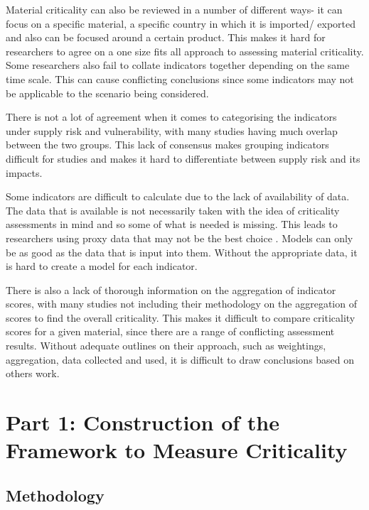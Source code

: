 \documentclass{article}
\begin{document}
Material criticality can also be reviewed in a number of different ways- it can focus on a specific material, a specific country in which it is imported/ exported and also can be focused around a certain product. This makes it hard for researchers to agree on a one size fits all approach to assessing material criticality. Some researchers also fail to collate indicators together depending on the same time scale. This can cause conflicting conclusions since some indicators may not be applicable to the scenario being considered.  

There is not a lot of agreement when it comes to categorising the indicators under supply risk and vulnerability, with many studies having much overlap between the two groups. This lack of consensus makes grouping indicators difficult for studies and makes it hard to differentiate between supply risk and its impacts. 

Some indicators are difficult to calculate due to the lack of availability of data. The data that is available is not necessarily taken with the idea of criticality assessments in mind and so some of what is needed is missing. This leads to researchers using proxy data that may not be the best choice \cite{schrijvers2020review}. Models can only be as good as the data that is input into them. Without the appropriate data, it is hard to create a model for each indicator. 

There is also a lack of thorough information on the aggregation of indicator scores, with many studies not including their methodology on the aggregation of scores to find the overall criticality. This makes it difficult to compare criticality scores for a given material, since there are a range of conflicting assessment results. Without adequate outlines on their approach, such as weightings, aggregation, data collected and used, it is difficult to draw conclusions based on others work. 



\section{Part 1: Construction of the Framework to Measure Criticality}

\subsection{Methodology}
\end{document}
